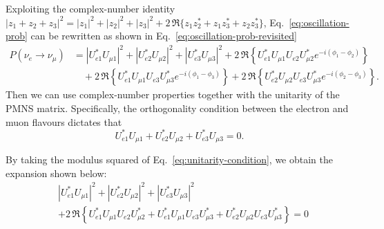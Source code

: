 Exploiting the complex-number identity $|z_1 +z_2 +z_3|^2 = |z_1|^2 + |z_2|^2 + |z_3|^2 + 2\,\Re\{z_1z_2^* + z_1z_3^* + z_2z_3^*\}$, 
Eq.~\ref{eq:oscillation-prob} can be rewritten as shown in Eq.~\ref{eq:oscillation-prob-revisited}
\begin{equation}
    \label{eq:oscillation-prob-revisited}
    \begin{aligned}
        P(\nu_e \to \nu_\mu) &= |U_{e1}^* U_{\mu 1}|^2 + |U_{e2}^* U_{\mu 2}|^2 + |U_{e3}^* U_{\mu 3}|^2 + 2\,\Re \left\{ U_{e1}^* U_{\mu 1} U_{e2} U_{\mu 2}^* e^{-i(\phi_1 - \phi_2)} \right\} \\
        &\quad + 2\,\Re \left\{ U_{e1}^* U_{\mu 1} U_{e3} U_{\mu 3}^* e^{-i(\phi_1 - \phi_3)} \right\} + 2\,\Re \left\{ U_{e2}^* U_{\mu 2} U_{e3} U_{\mu 3}^* e^{-i(\phi_2 - \phi_3)} \right\}.
    \end{aligned}
\end{equation}
Then we can use complex-number properties together with the unitarity of the PMNS matrix. 
Specifically, the orthogonality condition between the electron and muon flavours dictates that
\begin{equation}
    \label{eq:unitarity-condition}
    U_{e1}^* U_{\mu 1} + U_{e2}^* U_{\mu 2} + U_{e3}^* U_{\mu 3} = 0 .
\end{equation}

By taking the modulus squared of Eq.~\ref{eq:unitarity-condition}, we obtain the expansion shown below:
\begin{equation}
    \label{eq:unitarity-squared}
    \begin{aligned}
        &|U_{e1}^* U_{\mu 1}|^2 + |U_{e2}^* U_{\mu 2}|^2 + |U_{e3}^* U_{\mu 3}|^2 \\
        &+ 2\,\Re \left\{ U_{e1}^* U_{\mu 1} U_{e2} U_{\mu 2}^* + U_{e1}^* U_{\mu 1} U_{e3} U_{\mu 3}^* + U_{e2}^* U_{\mu 2} U_{e3} U_{\mu 3}^* \right\} = 0
    \end{aligned}
\end{equation}

